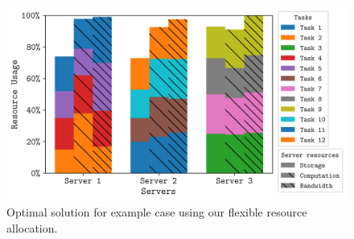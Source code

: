 \begin{figure}[ht]
    \includegraphics[width=\linewidth]{figs/allocation/optimal_flexible_resource_allocation.png}
    \caption{Optimal solution for example case using our flexible resource allocation.}
    \label{fig:example-flexible-solution}
\end{figure}